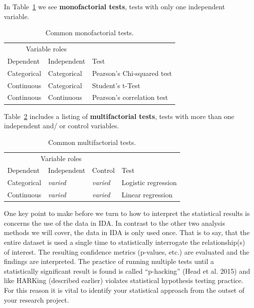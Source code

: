 \documentclass[
  letterpaper,
]{latex/krantz}
\begin{document}
In Table~\ref{tbl-ida-statistical-monofactorial-listing} we see
\textbf{monofactorial tests}, tests with only one independent variable.

\hypertarget{tbl-ida-statistical-monofactorial-listing}{}
\begin{table}
\caption{\label{tbl-ida-statistical-monofactorial-listing}Common monofactorial tests. }\tabularnewline

\centering
\begin{tabular}{lll}
\toprule
\multicolumn{2}{c}{Variable roles} & \multicolumn{1}{c}{ } \\
\cmidrule(l{3pt}r{3pt}){1-2}
Dependent & Independent & Test\\
\midrule
Categorical & Categorical & Pearson's Chi-squared test\\
Continuous & Categorical & Student's t-Test\\
Continuous & Continuous & Pearson's correlation test\\
\bottomrule
\end{tabular}
\end{table}

Table~\ref{tbl-ida-statistical-multifactorial-listing} includes a
listing of \textbf{multifactorial tests}, tests with more than one
independent and/ or control variables.

\hypertarget{tbl-ida-statistical-multifactorial-listing}{}
\begin{table}
\caption{\label{tbl-ida-statistical-multifactorial-listing}Common multifactorial tests. }\tabularnewline

\centering
\begin{tabular}{l>{}l>{}ll}
\toprule
\multicolumn{3}{c}{Variable roles} & \multicolumn{1}{c}{ } \\
\cmidrule(l{3pt}r{3pt}){1-3}
Dependent & Independent & Control & Test\\
\midrule
Categorical & \em{varied} & \em{varied} & Logistic regression\\
Continuous & \em{varied} & \em{varied} & Linear regression\\
\bottomrule
\end{tabular}
\end{table}

One key point to make before we turn to how to interpret the statistical
results is concerns the use of the data in IDA. In contrast to the other
two analysis methods we will cover, the data in IDA is only used once.
That is to say, that the entire dataset is used a single time to
statistically interrogate the relationship(s) of interest. The resulting
confidence metrics (p-values, etc.) are evaluated and the findings are
interpreted. The practice of running multiple tests until a
statistically significant result is found is called ``p-hacking'' (Head
et al. 2015) and like HARKing (described earlier) violates statistical
hypothesis testing practice. For this reason it is vital to identify
your statistical approach from the outset of your research project.
\end{document}
